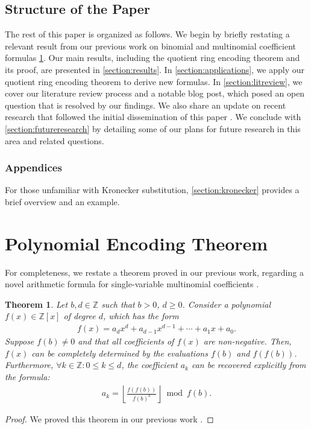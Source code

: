 \documentclass[12pt]{article}
\theoremstyle{plain}
\newtheorem{theorem}{Theorem}
\theoremstyle{definition}
\newcommand{\floor}[1]{\left\lfloor #1 \right\rfloor}
\begin{document}
\subsection{Structure of the Paper}
The rest of this paper is organized as follows. We begin by briefly restating a relevant result from our previous work \cite{shunia2023simple} on binomial and multinomial coefficient formulas \cref{section:encodingtheorem}. Our main results, including the quotient ring encoding theorem and its proof, are presented in \cref{section:results}. In \cref{section:applications}, we apply our quotient ring encoding theorem to derive new formulas. In \cref{section:litreview}, we cover our literature review process and a notable blog post, which posed an open question that is resolved by our findings. We also share an update on recent research that followed the initial dissemination of this paper \cite{prunescu2024representation}. We conclude with \cref{section:futureresearch} by detailing some of our plans for future research in this area and related questions.

\subsubsection{Appendices}
For those unfamiliar with Kronecker substitution, \cref{section:kronecker} provides a brief overview and an example.

\section{Polynomial Encoding Theorem} \label{section:encodingtheorem}
For completeness, we restate a theorem proved in our previous work, regarding a novel arithmetic formula for single-variable multinomial coefficients \cite{shunia2023simple}.

\begin{theorem} \label{theorem:encoding}
Let $b, d \in \mathbb{Z}$ such that $b > 0$, $d \geq 0$. Consider a polynomial $f(x) \in \mathbb{Z}[x]$ of degree $d$, which has the form
\begin{align*}
    f(x) = a_d x^d + a_{d-1} x^{d-1} + \cdots + a_1 x + a_0 .
\end{align*}
Suppose $f(b) \not= 0$ and that all coefficients of $f(x)$ are non-negative. Then, $f(x)$ can be completely determined by the evaluations $f(b)$ and $f(f(b))$. Furthermore, $\forall k \in \mathbb{Z} : 0 \leq k \leq d$, the coefficient $a_k$ can be recovered explicitly from the formula:
\begin{align*}
a_k = \floor{\frac{f(f(b))}{f(b)^{k}}} \bmod{f(b)} .
\end{align*}
\end{theorem}
\begin{proof}
We proved this theorem in our previous work \cite{shunia2023simple}.
\end{proof}
\end{document}
